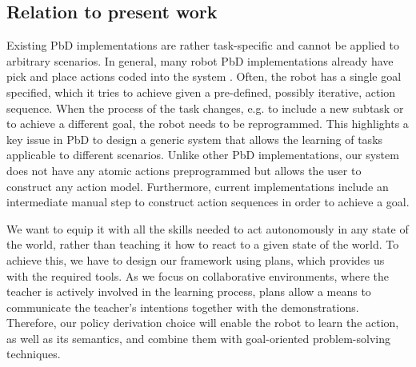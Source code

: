 \subsection{Relation to present work}

Existing PbD implementations are rather task-specific and cannot be applied to arbitrary scenarios.
In general, many robot PbD implementations already have pick and place actions coded into the system \cite{veeraraghavan2008teaching}.
Often, the robot has a single goal specified, which it tries to achieve given a pre-defined, possibly iterative, action sequence.
When the process of the task changes, e.g. to include a new subtask or to achieve a different goal, the robot needs to be reprogrammed.
This highlights a key issue in PbD to design a generic system that allows the learning of tasks applicable to different scenarios.
Unlike other PbD implementations, our system does not have any atomic actions preprogrammed but allows the user to construct any action model.
Furthermore, current implementations include an intermediate manual step to construct action sequences in order to achieve a goal.

We want to equip it with all the skills needed to act autonomously in any state of the world, rather than teaching it how to react to a given state of the world.
To achieve this, we have to design our framework using plans, which provides us with the required tools.
As we focus on collaborative environments, where the teacher is actively involved in the learning process, plans allow a means to communicate the teacher's intentions together with the demonstrations.
Therefore, our policy derivation choice will enable the robot to learn the action, as well as its semantics, and combine them with goal-oriented problem-solving techniques.
